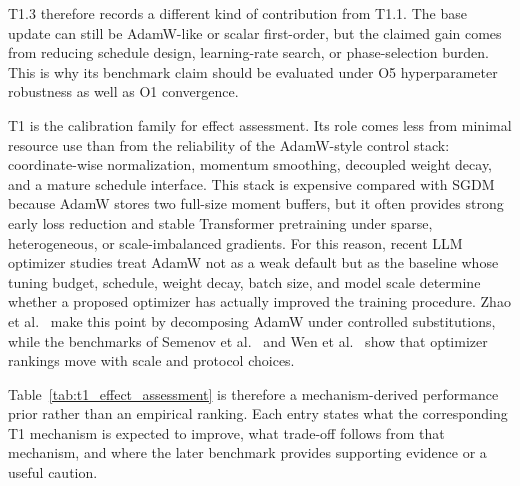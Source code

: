 T1.3 therefore records a different kind of contribution from T1.1.  The base
update can still be AdamW-like or scalar first-order, but the claimed gain
comes from reducing schedule design, learning-rate search, or phase-selection
burden.  This is why its benchmark claim should be evaluated under O5
hyperparameter robustness as well as O1 convergence.

T1 is the calibration family for effect assessment.  Its role comes less from
minimal resource use than from the reliability of the AdamW-style control
stack: coordinate-wise normalization, momentum smoothing, decoupled weight
decay, and a mature schedule interface.  This stack is expensive compared with
SGDM because AdamW stores two full-size moment buffers, but it often provides
strong early loss reduction and stable Transformer pretraining under sparse,
heterogeneous, or scale-imbalanced gradients.  For this reason, recent LLM
optimizer studies treat AdamW not as a weak default but as the baseline whose
tuning budget, schedule, weight decay, batch size, and model scale determine
whether a proposed optimizer has actually improved the training procedure.
Zhao et al.~\citep{zhao2025deconstructing} make this point by decomposing
AdamW under controlled substitutions, while the benchmarks of Semenov et
al.~\citep{semenov2025benchmarking} and Wen et al.~\citep{wen2025fantastic}
show that optimizer rankings move with scale and protocol choices.

Table~\ref{tab:t1_effect_assessment} is therefore a mechanism-derived
performance prior rather than an empirical ranking.  Each
entry states what the corresponding T1 mechanism is expected to improve, what
trade-off follows from that mechanism, and where the later benchmark provides
supporting evidence or a useful caution.



